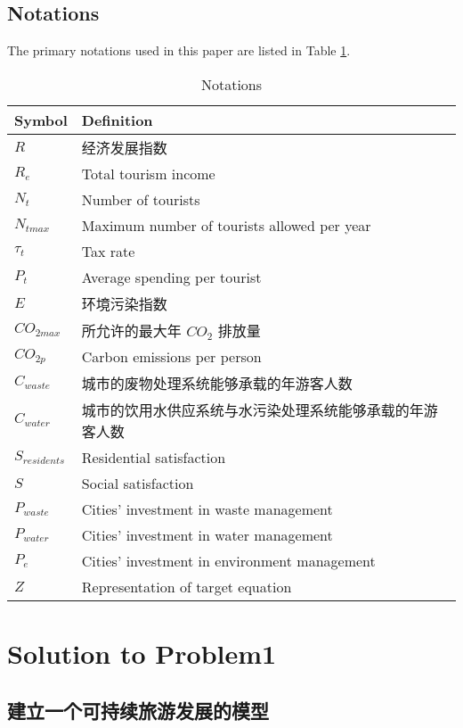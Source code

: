 \documentclass[12pt]{article}  %
\begin{document}
\subsection{Notations}
The primary notations used in this paper are listed in Table \ref{tb:notation}.

\begin{table}[H]
\begin{center}
\caption{Notations}
\begin{tabular}{>{\centering\arraybackslash}m{4cm} >{\centering\arraybackslash}m{10cm}}
	\toprule
		Symbol & Definition \\
	\midrule
		\(R\) & 经济发展指数 \\
	    \(R_{e}\) & Total tourism income \\
		\(N_{t}\) & Number of tourists \\
		\(N_{tmax}\) & Maximum number of tourists allowed per year \\
		\(\tau_{t}\) & Tax rate \\
		\(P_{t}\) & Average spending per tourist \\
		\(E\) & 环境污染指数 \\
		\(CO_{2max}\) & 所允许的最大年 \(CO_{2}\) 排放量 \\
		\(CO_{2p}\) & Carbon emissions per person \\
		\(C_{waste}\) & 城市的废物处理系统能够承载的年游客人数 \\
		\(C_{water}\) & 城市的饮用水供应系统与水污染处理系统能够承载的年游客人数 \\
		\(S_{residents}\) & Residential satisfaction \\
		\(S\) & Social satisfaction \\
		\(P_{waste}\) & Cities' investment in waste management \\
		\(P_{water}\) & Cities' investment in water management \\
		\(P_{e}\) & Cities' investment in environment management \\
		\(Z\) & Representation of target equation\\
	\bottomrule
\end{tabular}\label{tb:notation}
\end{center}
\end{table}

\section{Solution to Problem1}
\subsection{建立一个可持续旅游发展的模型}
\end{document}
